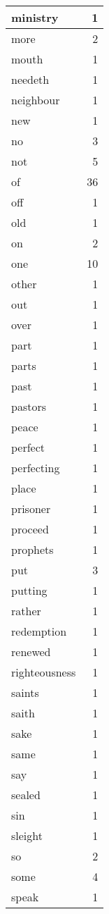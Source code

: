 \begin{center}
\begin{longtable}{l|r}
ministry & 1\\ \hline 
more & 2\\ \hline 
mouth & 1\\ \hline 
needeth & 1\\ \hline 
neighbour & 1\\ \hline 
new & 1\\ \hline 
no & 3\\ \hline 
not & 5\\ \hline 
of & 36\\ \hline 
off & 1\\ \hline 
old & 1\\ \hline 
on & 2\\ \hline 
one & 10\\ \hline 
other & 1\\ \hline 
out & 1\\ \hline 
over & 1\\ \hline 
part & 1\\ \hline 
parts & 1\\ \hline 
past & 1\\ \hline 
pastors & 1\\ \hline 
peace & 1\\ \hline 
perfect & 1\\ \hline 
perfecting & 1\\ \hline 
place & 1\\ \hline 
prisoner & 1\\ \hline 
proceed & 1\\ \hline 
prophets & 1\\ \hline 
put & 3\\ \hline 
putting & 1\\ \hline 
rather & 1\\ \hline 
redemption & 1\\ \hline 
renewed & 1\\ \hline 
righteousness & 1\\ \hline 
saints & 1\\ \hline 
saith & 1\\ \hline 
sake & 1\\ \hline 
same & 1\\ \hline 
say & 1\\ \hline 
sealed & 1\\ \hline 
sin & 1\\ \hline 
sleight & 1\\ \hline 
so & 2\\ \hline 
some & 4\\ \hline 
speak & 1\\ \hline 

\end{longtable}
\end{center}
